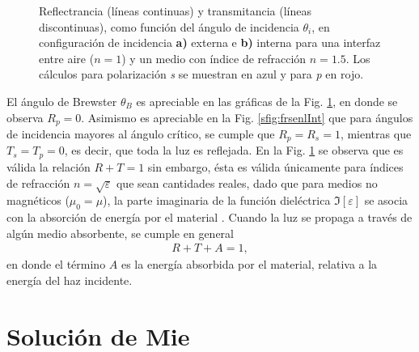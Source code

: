 \begin{figure}[h!]
\begin{subfigure}{.43\textwidth}
	\end{subfigure}\vspace*{-.7em}
	\caption{  Reflectrancia (líneas continuas) y transmitancia (líneas discontinuas), como función del ángulo de incidencia $\theta_i$, en configuración de incidencia \textbf{a)} externa e \textbf{b)} interna para una interfaz entre  aire ($n=1$) y un medio con índice de refracción $n = 1.5$. Los cálculos para polarización  \emph{s} se muestran  en azul y  para \emph{p} en rojo.}	\label{fig:frsnel}	
	\end{figure}	
%

El ángulo de Brewster $\theta_B$ es apreciable en las gráficas de la Fig. \ref{fig:frsnel}, en donde se observa $R_p = 0$. Asimismo es apreciable en la Fig. \ref{sfig:frsenlInt} que para ángulos de incidencia mayores al ángulo crítico, se cumple que $R_p = R_s = 1$, mientras que $T_s = T_p = 0$, es decir, que toda la luz es reflejada. En la Fig. \ref{fig:frsnel} se observa que es válida la relación $R + T = 1$ sin embargo, ésta es válida únicamente para índices de refracción $n = \sqrt{\varepsilon}$ que sean cantidades reales, dado que para medios no magnéticos ($\mu_0 = \mu$), la parte imaginaria de la función dieléctrica $\Im[\varepsilon]$ se asocia con la absorción de energía por el material \cite{ibach2003solid}. Cuando la luz se propaga a través de algún medio absorbente, se cumple en general 
	\begin{align*}
	R + T + A = 1,
	\end{align*}
en donde el término $A$ es la energía absorbida por el material, relativa a la energía del haz incidente.
	
\section{Solución de Mie}

